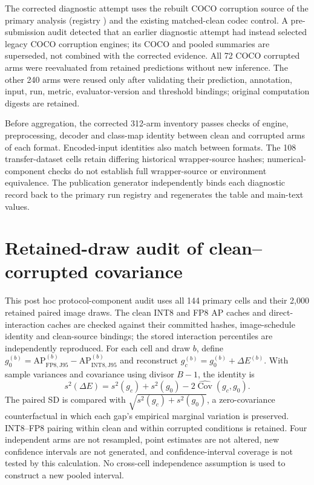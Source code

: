 \documentclass[10pt]{article}
\newcommand{\AP}{\mathrm{AP}}
\newcommand{\Jclean}{\mathrm{J95}}
\begin{document}
The corrected diagnostic attempt uses the rebuilt COCO corruption source of the primary analysis (registry ) and the existing matched-clean codec control. A pre-submission audit detected that an earlier diagnostic attempt had instead selected legacy COCO corruption engines; its COCO and pooled summaries are superseded, not combined with the corrected evidence. All 72 COCO corrupted arms were reevaluated from retained predictions without new inference. The other 240 arms were reused only after validating their prediction, annotation, input, run, metric, evaluator-version and threshold bindings; original computation digests are retained.

Before aggregation, the corrected 312-arm inventory passes checks of engine, preprocessing, decoder and class-map identity between clean and corrupted arms of each format. Encoded-input identities also match between formats. The 108 transfer-dataset cells retain differing historical wrapper-source hashes; numerical-component checks do not establish full wrapper-source or environment equivalence. The publication generator independently binds each diagnostic record back to the primary run registry and regenerates the table and main-text values.

\FloatBarrier
\section{Retained-draw audit of clean--corrupted covariance}

This post hoc protocol-component audit uses all 144 primary cells and their 2,000 retained paired image draws. The clean INT8 and FP8 AP caches and direct-interaction caches are checked against their committed hashes, image-schedule identity and clean-source bindings; the stored interaction percentiles are independently reproduced. For each cell and draw $b$, define $g_0^{(b)}=\AP_{\mathrm{FP8},\Jclean}^{(b)}-\AP_{\mathrm{INT8},\Jclean}^{(b)}$ and reconstruct $g_c^{(b)}=g_0^{(b)}+\Delta E^{(b)}$. With sample variances and covariance using divisor $B-1$, the identity is
\[
s^2(\Delta E)=s^2(g_c)+s^2(g_0)-2\widehat{\operatorname{Cov}}(g_c,g_0).
\]
The paired SD is compared with $\sqrt{s^2(g_c)+s^2(g_0)}$, a zero-covariance counterfactual in which each gap's empirical marginal variation is preserved. INT8--FP8 pairing within clean and within corrupted conditions is retained. Four independent arms are not resampled, point estimates are not altered, new confidence intervals are not generated, and confidence-interval coverage is not tested by this calculation. No cross-cell independence assumption is used to construct a new pooled interval.
\end{document}
